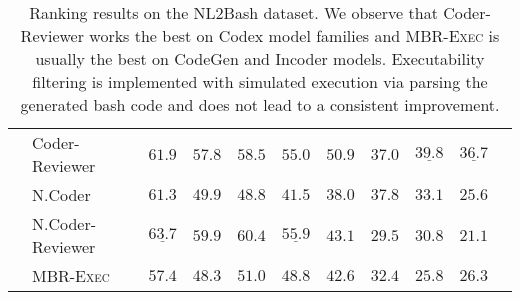 \documentclass[nohyperref]{article}
\theoremstyle{plain}
\theoremstyle{definition}
\theoremstyle{remark}
\begin{document}
\begin{table*}[]
\begin{tabular}{l|lccccccccc}
    & Coder-Reviewer &              $61.9$ &              $57.8$ &              $58.5$ &              $55.0$ &     $\mathbf{50.9}$ &              $37.0$ &  $\underline{39.8}$ &  $\underline{36.7}$ \\
\cmidrule{2-10}
    & N.Coder &              $61.3$ &              $49.9$ &              $48.8$ &              $41.5$ &              $38.0$ &     $\mathbf{37.8}$ &              $33.1$ &              $25.6$ \\
    & N.Coder-Reviewer &  $\underline{63.7}$ &     $\mathbf{59.9}$ &     $\mathbf{60.4}$ &  $\underline{55.9}$ &              $43.1$ &              $29.5$ &              $30.8$ &              $21.1$ \\
\cmidrule{2-10}
    & MBR-\textsc{Exec} &              $57.4$ &              $48.3$ &              $51.0$ &              $48.8$ &              $42.6$ &              $32.4$ &              $25.8$ &              $26.3$ \\
\bottomrule
\end{tabular}
 \caption{
Ranking results on the NL2Bash dataset. We observe that Coder-Reviewer works the best on Codex model families and MBR-\textsc{Exec} is usually the best on CodeGen and Incoder models. Executability filtering is implemented with simulated execution via parsing the generated bash code and does not lead to a consistent improvement.
}
\label{tab:app_nl2bash_exec}
\end{table*}
\end{document}
